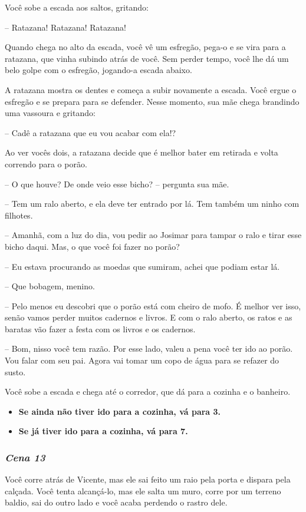 Você sobe a escada aos saltos, gritando:

-- Ratazana! Ratazana! Ratazana!

Quando chega no alto da escada, você vê um esfregão, pega-o e se vira para a ratazana, que vinha subindo atrás de você. Sem perder tempo, você lhe dá um belo golpe com o esfregão, jogando-a escada abaixo.

A ratazana mostra os dentes e começa a subir novamente a escada. Você ergue o esfregão e se prepara para se defender. Nesse momento, sua mãe chega brandindo uma vassoura e gritando:

-- Cadê a ratazana que eu vou acabar com ela!?

Ao ver vocês dois, a ratazana decide que é melhor bater em retirada e volta correndo para o porão.

-- O que houve? De onde veio esse bicho? -- pergunta sua mãe.

-- Tem um ralo aberto, e ela deve ter entrado por lá. Tem também um ninho com filhotes.

-- Amanhã, com a luz do dia, vou pedir ao Josimar para tampar o ralo e tirar esse bicho daqui. Mas, o que você foi fazer no porão?

-- Eu estava procurando as moedas que sumiram, achei que podiam estar lá.

-- Que bobagem, menino.

-- Pelo menos eu descobri que o porão está com cheiro de mofo.
É melhor ver isso, senão vamos perder muitos cadernos e livros. E com o ralo aberto, os ratos e as baratas vão fazer a festa com os livros e os cadernos.

-- Bom, nisso você tem razão. Por esse lado, valeu a pena você ter ido ao porão. Vou falar com seu pai. Agora vai tomar um copo de água para se refazer do susto.

Você sobe a escada e chega até o corredor, que dá para a cozinha e o banheiro.

\begin{itemize}
	\item \textbf{Se ainda não tiver ido para a cozinha, vá para 3.}
	\item \textbf{Se já tiver ido para a cozinha, vá para 7.}
\end{itemize}

\bigskip\medskip

\subsubsection{\textit{\textbf{Cena 13}}}
Você corre atrás de Vicente, mas ele sai feito um raio pela porta e dispara pela calçada. Você tenta alcançá-lo, mas ele salta um muro, corre por um terreno baldio, sai do outro lado e você acaba perdendo o rastro dele.

